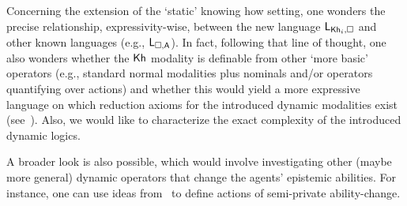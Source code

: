 Concerning the extension of the `static' knowing how setting, one wonders the precise relationship, expressivity-wise, between the new language $\mathsf{L}_{{\sf Kh}_i,\square}$ and other known languages (e.g., $\mathsf{L}_{\square,{\sf A}}$). In fact, following that line of thought, one also wonders whether the ${\sf Kh}$ modality is definable from other `more basic' operators (e.g., standard normal modalities plus nominals and/or operators quantifying over actions) and whether this would yield a more expressive language on which reduction axioms for the introduced dynamic modalities exist (see~\cite{BenthemMZ2022}). Also, we would like to characterize the exact complexity of the introduced dynamic logics.

A broader look is also possible, which would involve investigating other (maybe more general) dynamic operators that change the agents' epistemic abilities. For instance, one can use ideas from~\cite{BaltagMS98,GalimullinA22} to define actions of semi-private ability-change.  
